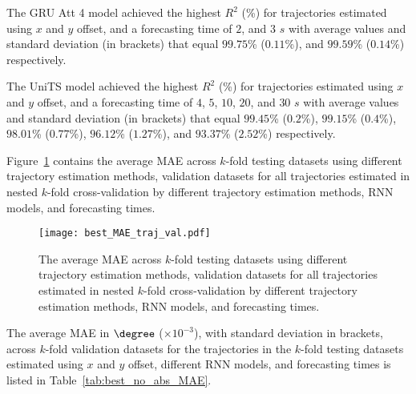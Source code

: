 The GRU Att 4 model achieved the highest $R^{2}$ (\%) for trajectories estimated using $x$ and $y$ offset, and a forecasting time of $2$, and $3$ $s$ with average values and standard deviation (in brackets) that equal $99.75$\% ($0.11$\%), and $99.59$\% ($0.14$\%) respectively.

The UniTS model achieved the highest $R^{2}$ (\%) for trajectories estimated using $x$ and $y$ offset, and a forecasting time of $4$, $5$, $10$, $20$, and $30$ $s$ with average values and standard deviation (in brackets) that equal $99.45$\% ($0.2$\%), $99.15$\% ($0.4$\%), $98.01$\% ($0.77$\%), $96.12$\% ($1.27$\%), and $93.37$\% ($2.52$\%) respectively.

Figure~\ref{fig:best_MAE_traj_val} contains the average MAE across $k$-fold testing datasets using different trajectory estimation methods, validation datasets for all trajectories estimated in nested $k$-fold cross-validation by different trajectory estimation methods, RNN models, and forecasting times.

\begin{figure}[!ht]
	\centering
	\texttt{[image: best\_MAE\_traj\_val.pdf]}
	\caption{The average MAE across $k$-fold testing datasets using different trajectory estimation methods, validation datasets for all trajectories estimated in nested $k$-fold cross-validation by different trajectory estimation methods, RNN models, and forecasting times.}
	\label{fig:best_MAE_traj_val}
\end{figure}

The average MAE in $\degree$ ($\times 10^{-3}$), with standard deviation in brackets, across $k$-fold validation datasets for the trajectories in the $k$-fold testing datasets estimated using $x$ and $y$ offset, different RNN models, and forecasting times is listed in Table~\ref{tab:best_no_abs_MAE}.

